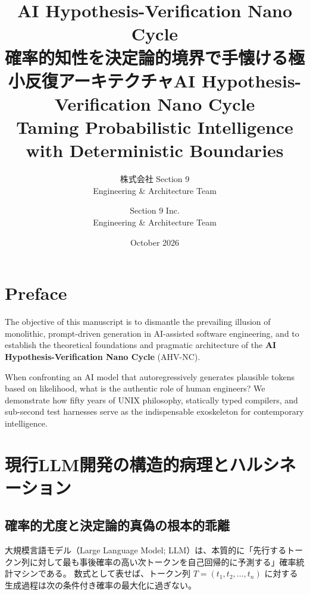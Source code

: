 \documentclass[11pt,a4paper,openany]{book}
\title{\textbf{AI Hypothesis-Verification Nano Cycle\texttrademark} \\ \Large 確率的知性を決定論的境界で手懐ける極小反復アーキテクチャ}
\author{株式会社 Section 9 \\ Engineering \& Architecture Team}
\title{\textbf{AI Hypothesis-Verification Nano Cycle\texttrademark} \\ \Large Taming Probabilistic Intelligence with Deterministic Boundaries}
\author{Section 9 Inc. \\ Engineering \& Architecture Team}
\date{October 2026}
\newif\ifja
\begin{document}
\frontmatter
\maketitle

\ifja
  \chapter*{前書き}
  本稿の目的は、生成AI（LLM）を用いたソフトウェア工学において蔓延する「巨大なプロンプトによる一括生成の幻想」を解体し、科学的かつ決定論的な超高速開発手法である \textbf{AI Hypothesis-Verification Nano Cycle\texttrademark}（AI仮説検証ナノサイクル\texttrademark）の理論的基盤と実践体系を確立することにある。

  確からしいトークンを確率的に紡ぎ出すAIに対して、人間が果たすべき真の役割とは何か。半世紀に及ぶUNIX哲学、静的型付けコンパイラ、そしてミリ秒単位のテストハーネスがいかにして現代の最先端知能の外骨格となり得るのかを詳説する。
\else
  \chapter*{Preface}
  The objective of this manuscript is to dismantle the prevailing illusion of monolithic, prompt-driven generation in AI-assisted software engineering, and to establish the theoretical foundations and pragmatic architecture of the \textbf{AI Hypothesis-Verification Nano Cycle\texttrademark} (AHV-NC).

  When confronting an AI model that autoregressively generates plausible tokens based on likelihood, what is the authentic role of human engineers? We demonstrate how fifty years of UNIX philosophy, statically typed compilers, and sub-second test harnesses serve as the indispensable exoskeleton for contemporary intelligence.
\fi

\tableofcontents

\mainmatter

\ifja
  \chapter{現行LLM開発の構造的病理とハルシネーション}
  \section{確率的尤度と決定論的真偽の根本的乖離}
  大規模言語モデル（Large Language Model; LLM）は、本質的に「先行するトークン列に対して最も事後確率の高い次トークンを自己回帰的に予測する」確率統計マシンである。
  数式として表せば、トークン列 $T = (t_1, t_2, \dots, t_n)$ に対する生成過程は次の条件付き確率の最大化に過ぎない。
\else
\end{document}
